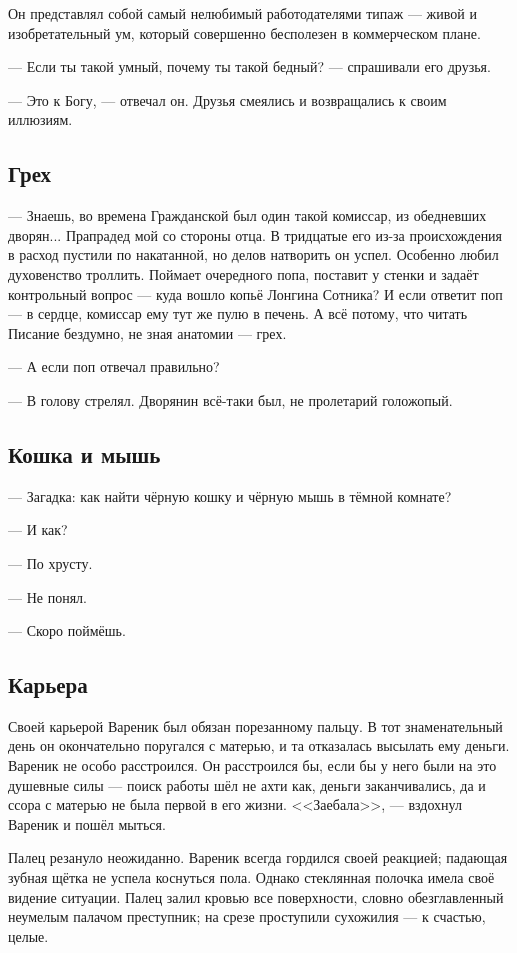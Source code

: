 Он представлял собой самый нелюбимый работодателями типаж --- живой и изобретательный ум, который совершенно бесполезен в коммерческом плане.

--- Если ты такой умный, почему ты такой бедный? --- спрашивали его друзья.

--- Это к Богу, --- отвечал он.
Друзья смеялись и возвращались к своим иллюзиям.

\subsection{Грех}

--- Знаешь, во времена Гражданской был один такой комиссар, из обедневших дворян...
Прапрадед мой со стороны отца.
В тридцатые его из-за происхождения в расход пустили по накатанной, но делов натворить он успел.
Особенно любил духовенство троллить.
Поймает очередного попа, поставит у стенки и задаёт контрольный вопрос --- куда вошло копьё Лонгина Сотника?
И если ответит поп --- в сердце, комиссар ему тут же пулю в печень.
А всё потому, что читать Писание бездумно, не зная анатомии --- грех.

--- А если поп отвечал правильно?

--- В голову стрелял.
Дворянин всё-таки был, не пролетарий голожопый.

\subsection{Кошка и мышь}

--- Загадка: как найти чёрную кошку и чёрную мышь в тёмной комнате?

--- И как?

--- По хрусту.

--- Не понял.

--- Скоро поймёшь.


\subsection{Карьера}

Своей карьерой Вареник был обязан порезанному пальцу.
В тот знаменательный день он окончательно поругался с матерью, и та отказалась высылать ему деньги.
Вареник не особо расстроился.
Он расстроился бы, если бы у него были на это душевные силы --- поиск работы шёл не ахти как, деньги заканчивались, да и ссора с матерью не была первой в его жизни.
<<Заебала>>, --- вздохнул Вареник и пошёл мыться.

Палец резануло неожиданно.
Вареник всегда гордился своей реакцией;
падающая зубная щётка не успела коснуться пола.
Однако стеклянная полочка имела своё видение ситуации.
Палец залил кровью все поверхности, словно обезглавленный неумелым палачом преступник;
на срезе проступили сухожилия --- к счастью, целые.

